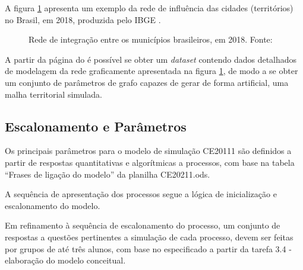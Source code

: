 A figura \ref{fig:malha} apresenta um exemplo da rede de influência das cidades (territórios) no Brasil, em 2018, produzida pelo IBGE \citep{coordenacao_de_geografia_do_ibge_regioes_2020}.

\begin{figure}
    \caption{Rede de integração entre os municípios brasileiros, em 2018. Fonte: \cite[p. 14]{coordenacao_de_geografia_do_ibge_regioes_2020}}
    \label{fig:malha}
\end{figure}

A partir da página do \cite{ibge_regioes_2021} é possível se obter um \textit{dataset} contendo dados detalhados de modelagem da rede graficamente apresentada na figura \ref{fig:malha}, de modo a se obter um conjunto de parâmetros de grafo capazes de gerar de forma artificial, uma malha territorial simulada.

\subsection{Escalonamento e Parâmetros}

Os principais parâmetros para o modelo de simulação CE20111 são definidos a partir de respostas quantitativas e algorítmicas a processos, com base na tabela ``Frases de ligação do modelo'' da planilha CE20211.ods.

A sequência de apresentação dos processos segue a lógica de inicialização e escalonamento do modelo.

Em refinamento à sequência de escalonamento do processo, um conjunto de respostas a questões pertinentes a simulação de cada processo, devem ser feitas por grupos de até três alunos, com base no especificado a partir da tarefa 3.4 - elaboração do modelo conceitual.


